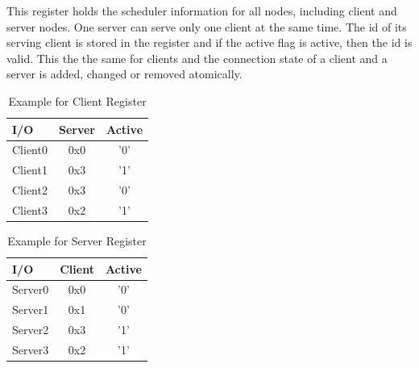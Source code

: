     This register holds the scheduler information for all nodes, including client and server nodes. One server can serve only one client at the same time. The id of its serving client is stored in the register and if the active flag is active, then the id is valid. This the the same for clients and the connection state of a client and a server is added, changed or removed atomically.
    
     \begin{table}[htb]
	\centering
	\caption{Example for Client Register }
	\begin{tabular}{l c c}
		\toprule
		I/O  & Server  & Active \\ \midrule
		Client0  &  0x0 & '0'\\
		Client1  &  0x3 & '1'\\
		Client2  &  0x3 & '0'\\
		Client3  &  0x2 & '1'\\	
		\bottomrule
	\end{tabular}
	\label{tab:csreg}
\end{table}

     \begin{table}[htb]
	\centering
	\caption{Example for Server Register }
	\begin{tabular}{l c c}
		\toprule
		I/O  & Client  & Active \\ \midrule
		Server0  &  0x0 & '0'\\
		Server1  &  0x1 & '0'\\
		Server2  &  0x3 & '1'\\
		Server3  &  0x2 & '1'\\	
		\bottomrule
	\end{tabular}
	\label{tab:csreg2}
\end{table}

